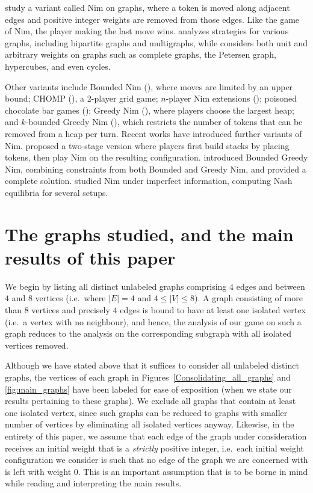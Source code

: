 \documentclass[11pt,reqno]{amsart}
\theoremstyle{definition}
\theoremstyle{definition}
\begin{document}
\cite{fukuyama2003nim,fukuyamanim2003,erickson2011game} study a variant called Nim on graphs, where a token is moved along adjacent edges and positive integer weights are removed from those edges. Like the game of Nim, the player making the last move wins. \cite{fukuyama2003nim} analyzes strategies for various graphs, including bipartite graphs and multigraphs, while \cite{erickson2011game} considers both unit and arbitrary weights on graphs such as complete graphs, the Petersen graph, hypercubes, and even cycles. 

Other variants include Bounded Nim  (\cite{schwartz1971some}), where moves are limited by an upper bound; CHOMP  (\cite{gale1974curious}), a 2-player grid game; $n$-player Nim extensions (\cite{li1978n}); poisoned chocolate bar games (\cite{robin1989poisoned}); Greedy Nim (\cite{albert2004nim}), where players choose the largest heap; and $k$-bounded Greedy Nim (\cite{lv2018greedy}), which restricts the number of tokens that can be removed from a heap per turn.
Recent works have introduced further variants of Nim.  \cite{duchene2016building} proposed a two-stage version where players first build stacks by placing tokens, then play Nim on the resulting configuration.  \cite{XU20181} introduced Bounded Greedy Nim, combining constraints from both Bounded and Greedy Nim, and provided a complete solution.  \cite{van2022nim} studied Nim under imperfect information, computing Nash equilibria for several setups. 

\section{The graphs studied, and the main results of this paper}\label{sec:graphs_main_results}
We begin by listing all distinct unlabeled graphs comprising $4$ edges and between $4$ and $8$ vertices (i.e.\ where $|E|=4$ and $4 \leqslant |V| \leqslant 8$). A graph consisting of more than $8$ vertices and precisely $4$ edges is bound to have at least one isolated vertex (i.e.\ a vertex with no neighbour), and hence, the analysis of our game on such a graph reduces to the analysis on the corresponding subgraph with all isolated vertices removed.

Although we have stated above that it suffices to consider all unlabeled distinct graphs, the vertices of each graph in Figures~\ref{Consolidating_all_graphs} and \ref{fig:main_graphs} have been labeled for ease of exposition (when we state our results pertaining to these graphs). We exclude all graphs that contain at least one isolated vertex, since such graphs can be reduced to graphs with smaller number of vertices by eliminating all isolated vertices anyway. Likewise, in the entirety of this paper, we assume that each edge of the graph under consideration receives an initial weight that is a \emph{strictly} positive integer, i.e.\ each initial weight configuration we consider is such that no edge of the graph we are concerned with is left with weight $0$. This is an important assumption that is to be borne in mind while reading and interpreting the main results.
\end{document}
